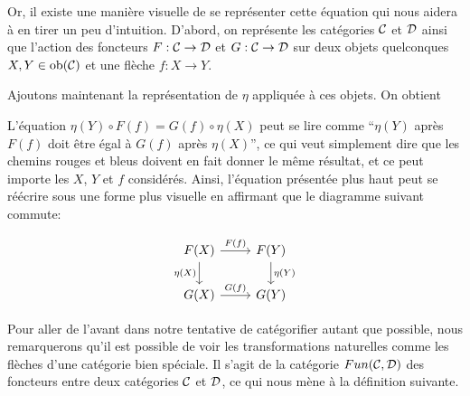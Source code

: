 Or, il existe une manière visuelle de se représenter cette équation qui nous
aidera à en tirer un peu d'intuition. D'abord, on représente les catégories
$\mathcal{C}$ et $\mathcal{D}$ ainsi que l'action des foncteurs $F : \mathcal{C} \to \mathcal{D}$ et $G : \mathcal{C} \to \mathcal{D}$
sur deux objets quelconques $X,Y \in \mathrm{ob}(\mathcal{C})$ et une flèche $f : X \to Y$.


Ajoutons maintenant la représentation de $\eta$ appliquée à ces objets. On
obtient


L'équation $\eta(Y) \circ F(f) = G(f) \circ \eta(X)$ peut se lire comme
``$\eta(Y)$ après $F(f)$ doit être égal à $G(f)$ après $\eta(X)$'', ce
qui veut simplement dire que les chemins rouges et bleus doivent en fait
donner le même résultat, et ce peut importe les $X$, $Y$ et $f$ considérés.
Ainsi, l'équation présentée plus haut peut se réécrire sous une forme plus
visuelle en affirmant que le diagramme suivant commute:

\[
\begin{tikzcd}
    F(X) \arrow[d, "\eta(X)"'] \arrow[r, "F(f)"] & F(Y) \arrow[d, "\eta(Y)"] \\
    G(X) \arrow[r, "G(f)"] & G(Y)
\end{tikzcd}
\]

Pour aller de l'avant dans notre tentative de catégorifier autant que possible,
nous remarquerons qu'il est possible de voir les transformations naturelles
comme les flèches d'une catégorie bien spéciale. Il s'agit de la catégorie
$Fun(\mathcal{C}, \mathcal{D})$ des foncteurs entre deux catégories $\mathcal{C}$ et $\mathcal{D}$, ce qui nous
mène à la définition suivante.

